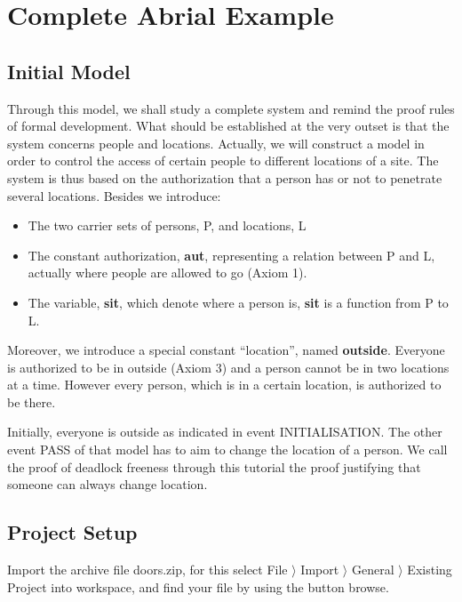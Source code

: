 \section{Complete Abrial Example}
\label{tutorial_10}


\subsection{Initial Model}
Through this model, we shall study a complete system and remind the proof rules of formal development.
What should be established at the very outset is that the system concerns people and locations. Actually, we will construct a model in order to control the access of certain people to different locations of a site.
The system is thus based on the authorization that a person has or not to penetrate several locations.
Besides we introduce:
\begin{itemize}
	\item The two carrier sets of persons, P, and locations, L
	\item The constant authorization, \textbf{aut}, representing a relation between P and L, actually where people are allowed to go (Axiom 1).
	\item The variable, \textbf{sit}, which denote where a person is, \textbf{sit} is a function from P to L.
\end{itemize}  
Moreover, we introduce a special constant “location”, named \textbf{outside}. Everyone is authorized to be in outside (Axiom 3) and a person cannot be in two locations at a time. However every person, which is in a certain location, is authorized to be there.

Initially, everyone is outside as indicated in event \textsf{INITIALISATION}.
The other event \textsf{PASS} of that model has to aim to change the location of a person.
We call the proof of deadlock freeness through this tutorial the proof justifying that someone can always change location.


\subsection{Project Setup}
Import the archive file doors.zip, for this select  \textsf{File $\rangle$ Import $\rangle$ General $\rangle$ Existing Project into workspace}, and find your file by using the button browse.

